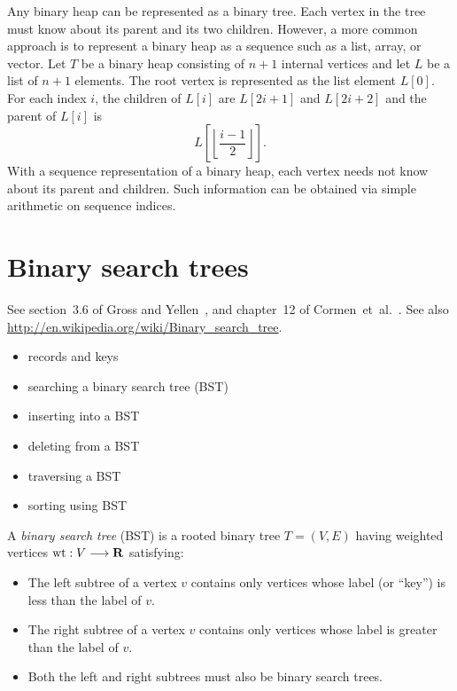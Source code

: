 Any binary heap can be represented as a binary tree. Each vertex in
the tree must know about its parent and its two children. However, a
more common approach is to represent a binary heap as a sequence such
as a list, array, or vector. Let $T$ be a binary heap consisting of
$n + 1$ internal vertices and let $L$ be a list of $n + 1$
elements. The root vertex is represented as the list element
$L[0]$. For each index $i$, the children of $L[i]$ are $L[2i + 1]$ and
$L[2i + 2]$ and the parent of $L[i]$ is
\[
L\left[ \left\lfloor \frac{i - 1}{2} \right\rfloor \right].
\]
With a sequence representation of a binary heap, each vertex needs not
know about its parent and children. Such information can be obtained
via simple arithmetic on sequence indices.



\section{Binary search trees}

See section~3.6 of Gross and Yellen~\cite{GrossYellen1999}, and
chapter~12 of Cormen~et~al.~\cite{CormenEtAl2001}. See also
\url{http://en.wikipedia.org/wiki/Binary_search_tree}.


\begin{itemize}
\item records and keys

\item searching a binary search tree (BST)

\item inserting into a BST

\item deleting from a BST

\item traversing a BST

\item sorting using BST
\end{itemize}

A {\it binary search tree} (BST) is a rooted binary tree
$T=(V,E)$ having weighted vertices ${\rm wt}:V\longrightarrow \mathbf{R}$ satisfying:

\begin{itemize}
\item
 The left subtree of a vertex $v$ contains only vertices whose label
(or ``key'') is less than the label of $v$.
\item
The right subtree of a vertex $v$ contains only vertices whose label
  is greater than the label of $v$.
\item
Both the left and right subtrees must also be binary search trees.
\end{itemize}


